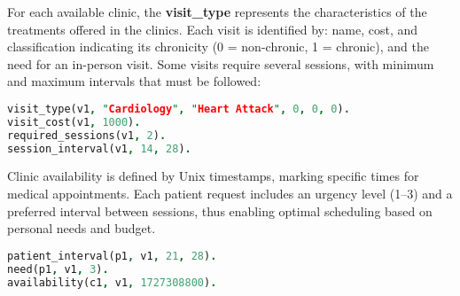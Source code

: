 \documentclass{tlp}
\begin{document}
For each available clinic, the \textbf{visit\_type} represents the characteristics of the treatments offered in the clinics. Each visit is identified by: name, cost, and classification indicating its chronicity (0 = non-chronic, 1 = chronic), and the need for an in-person visit. Some visits require several sessions, with minimum and maximum intervals that must be followed:
\begin{lstlisting}[language=Prolog, caption=Visit Type Definition and Constraints]
visit_type(v1, "Cardiology", "Heart Attack", 0, 0, 0).
visit_cost(v1, 1000).
required_sessions(v1, 2).
session_interval(v1, 14, 28).
\end{lstlisting}

Clinic availability is defined by Unix timestamps, marking specific times for medical appointments. Each patient request includes an urgency level (1–3) and a preferred interval between sessions, thus enabling optimal scheduling based on personal needs and budget.

\begin{lstlisting}[language=Prolog, caption=Patient Needs Preferences and Clinic Availability]
patient_interval(p1, v1, 21, 28).         
need(p1, v1, 3).                           
availability(c1, v1, 1727308800).         
\end{lstlisting}




\end{document}
